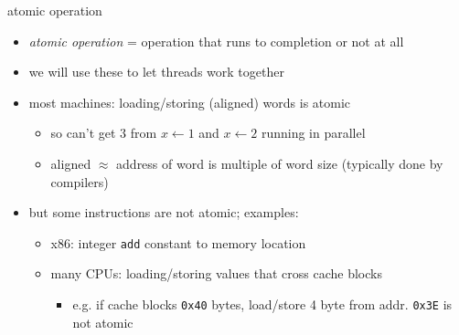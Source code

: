 \begin{frame}{atomic operation}
\begin{itemize}
\item \textit{atomic operation} = operation that runs to completion or not at all
\item we will use these to let threads work together
\vspace{.5cm}
\item most machines: loading/storing {\small (aligned)} words is atomic
    \begin{itemize}
    \item so can't get $3$ from $x \leftarrow 1$ and $x \leftarrow 2$ running in parallel
    \item aligned $\approx$ address of word is multiple of word size (typically done by compilers)
    \end{itemize}
\item but some instructions are not atomic; examples:
    \begin{itemize}
    \item x86: integer \texttt{add} constant to memory location
    \item many CPUs: loading/storing values that cross cache blocks
        \begin{itemize}
            \item e.g. if cache blocks \texttt{0x40} bytes, load/store 4 byte from addr. \texttt{0x3E} is not atomic
        \end{itemize}
    \end{itemize}
\end{itemize}
\end{frame}

